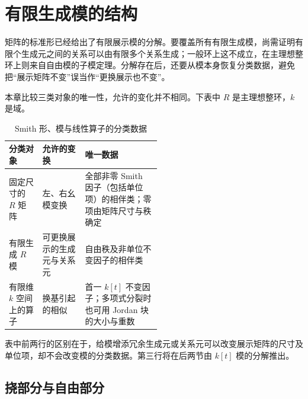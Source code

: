 
\section{有限生成模的结构}
\label{b2:sec:0403}


矩阵的标准形已经给出了有限展示模的分解。要覆盖所有有限生成模，尚需证明有限个生成元之间的关系可以由有限多个关系生成；一般环上这不成立，在主理想整环上则来自自由模的子模定理。分解存在后，还要从模本身恢复分类数据，避免把“展示矩阵不变”误当作“更换展示也不变”。

本章比较三类对象的唯一性，允许的变化并不相同。下表中 \(R\) 是主理想整环，\(k\) 是域。

\begin{table}[htbp]
	\centering
	\caption{Smith 形、模与线性算子的分类数据}\label{b2:tab:pid-uniqueness-levels}
	\begin{tabularx}{\linewidth}{@{}>{\raggedright\arraybackslash}p{0.22\linewidth}>{\raggedright\arraybackslash}p{0.29\linewidth}>{\raggedright\arraybackslash}X@{}}
		\toprule
		分类对象 & 允许的变换 & 唯一数据 \\
		\midrule
		固定尺寸的 \(R\) 矩阵 & 左、右幺模变换 & 全部非零 Smith 因子（包括单位项）的相伴类；零项由矩阵尺寸与秩确定 \\
		有限生成 \(R\) 模 & 可更换展示的生成元与关系元 & 自由秩及非单位不变因子的相伴类 \\
		有限维 \(k\) 空间上的算子 & 换基引起的相似 & 首一 \(k[t]\) 不变因子；多项式分裂时也可用 Jordan 块的大小与重数 \\
		\bottomrule
	\end{tabularx}
\end{table}

表中前两行的区别在于，给模增添冗余生成元或关系元可以改变展示矩阵的尺寸及单位项，却不会改变模的分类数据。第三行将在后两节由 \(k[t]\) 模的分解推出。

\subsection{挠部分与自由部分}
\label{b2:subsec:0403:01}


